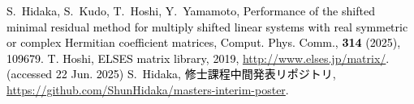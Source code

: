 


\textcolor{black}{
\fontsize{28pt}{15pt}\selectfont
\begin{thebibliography}{7}
	\vspace{-2mm}
		S.~Hidaka, S.~Kudo, T.~Hoshi, Y.~Yamamoto,
		Performance of the shifted minimal residual method for multiply shifted linear systems with real symmetric or complex Hermitian coefficient matrices,
		Comput. Phys. Comm., \textbf{314} (2025), 109679.
		T. Hoshi, ELSES matrix library, 2019, \url{http://www.elses.jp/matrix/}. (accessed 22 Jun. 2025)
		S.~Hidaka, 修士課程中間発表リポジトリ,\\
		\url{https://github.com/ShunHidaka/masters-interim-poster}.
\end{thebibliography}
}


\begin{comment}




	\bibitem{ref-SeitoH-2019}
		S.~Hiroaki, T.~Hoshi, and Y.~Yamamoto,
		\newblock On using the shifted minimal residual method for quantum-mechanical wave packet simulation,
		\newblock JSIAM Let., {\bf 11} (2019), 13--16.
	\bibitem{ref-SogabeT-2010}
		S.~Tomohiro et.al.,
		\newblock A fast numerical method for generalized shifted linear systems with complex symmetric matrices,
		\newblock 数理解析研究所講究録., {\bf 1719} (2010), 106--117.


\end{comment}
